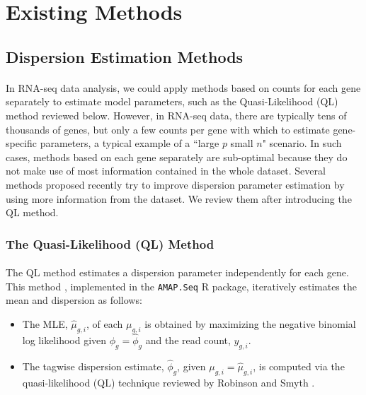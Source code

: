 \documentclass[10pt]{article}
\providecommand{\wh}[1]{\widehat{#1}}
\begin{document}
\section*{Existing Methods}

\subsection*{Dispersion Estimation Methods} \label{sec:disp}

\paragraph{} \indent In RNA-seq data analysis, we could apply methods based on counts for each gene separately to estimate model parameters, such as the Quasi-Likelihood (QL) method reviewed below. However,
in RNA-seq data, there are typically tens of thousands of genes, but only a few counts per gene with which to estimate gene-specific parameters, a typical example of a ``large $p$ small $n$" scenario. In such cases, methods based on each gene separately are sub-optimal because they do not make use of most information contained in the whole dataset. Several methods proposed recently try to improve  dispersion parameter estimation by using more information from the dataset. We review them after introducing the QL method.

\subsubsection*{The Quasi-Likelihood (QL) Method} \label{subsec:amap}

\paragraph{} \indent The QL method estimates a dispersion parameter independently for each gene. This method \cite{amap_m} \cite{amap}, implemented in the {\tt AMAP.Seq} R package, iteratively estimates the mean and dispersion as follows:

\begin{itemize}
\item The MLE, $\wh{\mu}_{g, i}$, of each $\mu_{g, i}$ is obtained by maximizing the negative binomial log likelihood given $\phi_g = \wh{\phi}_g$ and the read count, $y_{g, i}$.
\item The tagwise dispersion estimate, $\wh{\phi}_g$, given $\mu_{g, i} = \wh{\mu}_{g, i}$, is computed via the quasi-likelihood (QL) technique reviewed by Robinson and Smyth \cite{rs08}.
\end{itemize}
\end{document}
